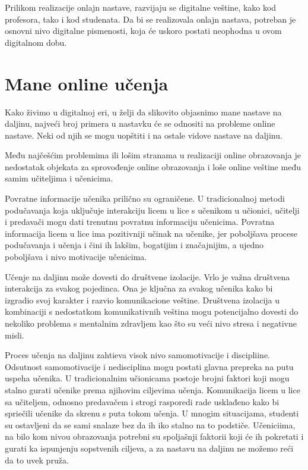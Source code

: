 \documentclass{article}
\begin{document}
Prilikom realizacije onlajn nastave, razvijaju se digitalne veštine, kako kod profesora, tako i kod studenata. Da bi se realizovala onlajn nastava, potreban je osnovni nivo digitalne pismenosti, koja će uskoro postati neophodna u ovom digitalnom dobu.


\section{Mane online učenja}

Kako živimo u digitalnoj eri, u želji da slikovito objasnimo mane nastave na daljinu, najveći broj primera u nastavku će se odnositi na probleme online nastave. Neki od njih se mogu uopštiti i na ostale vidove nastave na daljinu.

Među najčešćim problemima ili lošim stranama u realizaciji online obrazovanja je nedostatak objekata za sprovođenje online obrazovanja i loše online veštine među samim učiteljima i učenicima. 

Povratne informacije učenika prilično su ograničene.
U tradicionalnoj metodi podučavanja koja uključuje interakciju licem u lice s učenikom u učionici, učitelji i predavači mogu dati trenutnu povratnu informaciju učenicima. Povratna informacija licem u lice ima pozitivniji učinak na učenike, jer poboljšava procese podučavanja i učenja i čini ih lakšim, bogatijim i značajnijim, a ujedno poboljšava i nivo motivacije učenicima.

Učenje na daljinu može dovesti do društvene izolacije. Vrlo je važna društvena interakcija za svakog pojedinca. Ona je ključna za svakog učenika kako bi izgradio svoj karakter i razvio komunikacione veštine.  Društvena izolacija u kombinaciji s nedostatkom komunikativnih veština mogu potencijalno dovesti do nekoliko problema s mentalnim zdravljem kao što su veći nivo stresa i negativne misli.

Proces učenja na daljinu zahtieva visok nivo  samomotivacije i discipliine. Odsutnost samomotivacije i nedisciplina  mogu postati glavna prepreka na putu uspeha učenika. U tradicionalnim učionicama postoje brojni faktori koji mogu stalno gurati učenike prema njihovim ciljevima učenja. Komunikacija licem u lice sa učiteljem, odnosno predavačem i strogi rasporedi rade usklađeno kako bi spriečili učenike da skrenu s puta tokom učenja. U mnogim situacijama, studenti su ostavljeni da se sami snalaze bez da ih iko stalno na to podstiče. Učeniciima, na bilo kom nivou obrazovanja potrebni su spoljašnji faktorii koji će ih pokretati i gurati ka ispunjenju sopstvenih ciljeva, a za nastavu na daljinu ne možemo reći da to uvek pruža.
\end{document}
